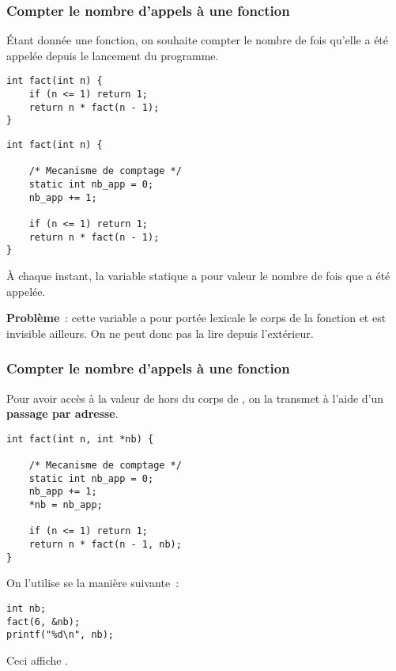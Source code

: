 \begin{frame}[fragile]
\frametitle{Compter le nombre d'appels à une fonction}
Étant donnée une fonction, on souhaite compter le nombre de fois qu'elle
a été appelée depuis le lancement du programme.
\medskip

\begin{multicols}{2}
\begin{lstlisting}
int fact(int n) {
    if (n <= 1) return 1;
    return n * fact(n - 1);
}
\end{lstlisting}
\bigskip
\bigskip
\bigskip
\bigskip
\bigskip

\begin{lstlisting}
int fact(int n) {

    /* Mecanisme de comptage */
    static int nb_app = 0;
    nb_app += 1;

    if (n <= 1) return 1;
    return n * fact(n - 1);
}
\end{lstlisting}
\end{multicols}

À chaque instant, la variable statique  a pour valeur le
nombre de fois que  a été appelée.
\medskip

{\bf Problème}~: cette variable a pour portée lexicale le corps de la
fonction  et est invisible ailleurs. On ne peut donc pas
la lire depuis l'extérieur.
\end{frame}

\begin{frame}[fragile]
\frametitle{Compter le nombre d'appels à une fonction}
Pour avoir accès à la valeur de  hors du corps de ,
on la transmet à l'aide d'un {\bf passage par adresse}.
\begin{lstlisting}
int fact(int n, int *nb) {

    /* Mecanisme de comptage */
    static int nb_app = 0;
    nb_app += 1;
    *nb = nb_app;

    if (n <= 1) return 1;
    return n * fact(n - 1, nb);
}
\end{lstlisting}
\bigskip

On l'utilise se la manière suivante~:
\begin{multicols}{2}
\begin{lstlisting}
int nb;
fact(6, &nb);
printf("%d\n", nb);
\end{lstlisting}
Ceci affiche .
\bigskip
\bigskip
\bigskip
\end{multicols}
\end{frame}

